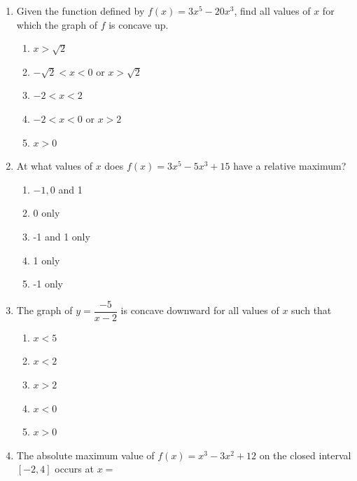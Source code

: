 \documentclass{article}
\begin{document}
\begin{enumerate}
	\itemsep2em
	\item
	\begin{minipage}[t]{\linewidth}
		Given the function defined by \(f(x)=3 x^{5}-20 x^{3}\), find all values
of \(x\) for which the graph of \(f\) is concave up.
\vspace{1em}
		\begin{enumerate}
		\itemsep1em
			\item \(x>\sqrt{2}\)
			\item \(-\sqrt{2}<x<0\) or \(x>\sqrt{2}\)
			\item \(-2<x<2\)
			\item \(-2<x<0\) or \(x>2\)
			\item \(x>0\)
		\end{enumerate}
	\end{minipage}
	\item
	\begin{minipage}[t]{\linewidth}
		At what values of \(x\) does \(f(x)=3 x^{5}-5 x^{3}+15\) have a relative
maximum?
\vspace{1em}
		\begin{enumerate}
		\itemsep1em
			\item \(-1,0\) and 1
			\item 0 only
			\item -1 and 1 only
			\item 1 only
			\item -1 only
		\end{enumerate}
	\end{minipage}
	\item
	\begin{minipage}[t]{\linewidth}
		The graph of \(y=\dfrac{-5}{x-2}\) is concave downward for all values of
\(x\) such that
\vspace{1em}
		\begin{enumerate}
		\itemsep1em
			\item \(x<5\)
			\item \(x<2\)
			\item \(x>2\)
			\item \(x<0\)
			\item \(x>0\)
		\end{enumerate}
	\end{minipage}
	\item
	\begin{minipage}[t]{\linewidth}
		The absolute maximum value of \(f(x)=x^{3}-3 x^{2}+12\) on the closed
interval \([-2,4]\) occurs at \(x=\)

\end{minipage}
\end{enumerate}
\end{document}
